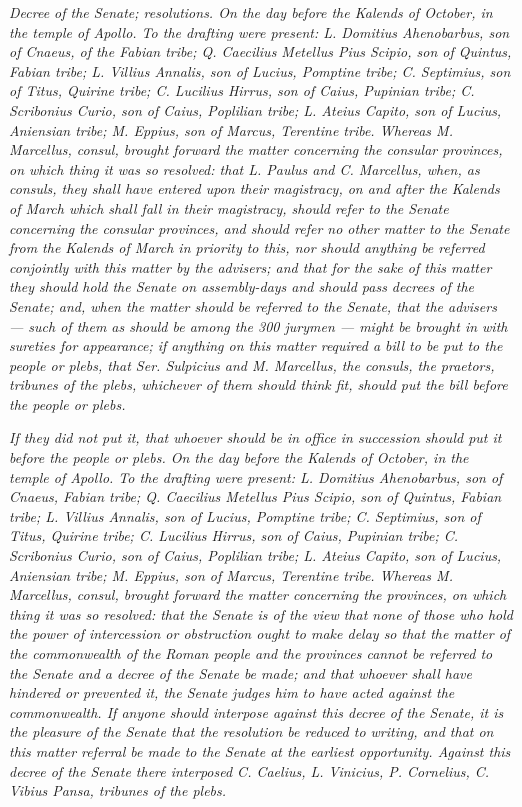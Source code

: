  \textit{Decree of the Senate; resolutions. On the day before the Kalends of October, in the temple of Apollo. To the drafting were present: L. Domitius Ahenobarbus, son of Cnaeus, of the Fabian tribe; Q. Caecilius Metellus Pius Scipio, son of Quintus, Fabian tribe; L. Villius Annalis, son of Lucius, Pomptine tribe; C. Septimius, son of Titus, Quirine tribe; C. Lucilius Hirrus, son of Caius, Pupinian tribe; C. Scribonius Curio, son of Caius, Poplilian tribe; L. Ateius Capito, son of Lucius, Aniensian tribe; M. Eppius, son of Marcus, Terentine tribe. Whereas M. Marcellus, consul, brought forward the matter concerning the consular provinces, on which thing it was so resolved: that L. Paulus and C. Marcellus, when, as consuls, they shall have entered upon their magistracy, on and after the Kalends of March which shall fall in their magistracy, should refer to the Senate concerning the consular provinces, and should refer no other matter to the Senate from the Kalends of March in priority to this, nor should anything be referred conjointly with this matter \textit{by the advisers}; and that for the sake of this matter they should hold the Senate on assembly-days and should pass decrees of the Senate; and, when the matter should be referred to the Senate, that the advisers --- such of them as should be among the 300 jurymen --- might be brought in \textit{with sureties for appearance}; if anything on this matter required a bill to be put to the people or plebs, that Ser. Sulpicius and M. Marcellus, the consuls, the praetors, tribunes of the plebs, whichever of them should think fit, should put the bill before the people or plebs.}

 \textit{If they did not put it, that whoever should be in office in succession should put it before the people or plebs. On the day before the Kalends of October, in the temple of Apollo. To the drafting were present: L. Domitius Ahenobarbus, son of Cnaeus, Fabian tribe; Q. Caecilius Metellus Pius Scipio, son of Quintus, Fabian tribe; L. Villius Annalis, son of Lucius, Pomptine tribe; C. Septimius, son of Titus, Quirine tribe; C. Lucilius Hirrus, son of Caius, Pupinian tribe; C. Scribonius Curio, son of Caius, Poplilian tribe; L. Ateius Capito, son of Lucius, Aniensian tribe; M. Eppius, son of Marcus, Terentine tribe. Whereas M. Marcellus, consul, brought forward the matter concerning the provinces, on which thing it was so resolved: that the Senate is of the view that none of those who hold the power of intercession or obstruction ought to make delay so that the matter of the commonwealth of the Roman people and the provinces cannot be referred to the Senate and a decree of the Senate be made; and that whoever shall have hindered or prevented it, the Senate judges him to have acted against the commonwealth. If anyone should interpose against this decree of the Senate, it is the pleasure of the Senate that the resolution be reduced to writing, and that on this matter referral be made to the Senate at the earliest opportunity. Against this decree of the Senate there interposed C. Caelius, L. Vinicius, P. Cornelius, C. Vibius Pansa, tribunes of the plebs.}

